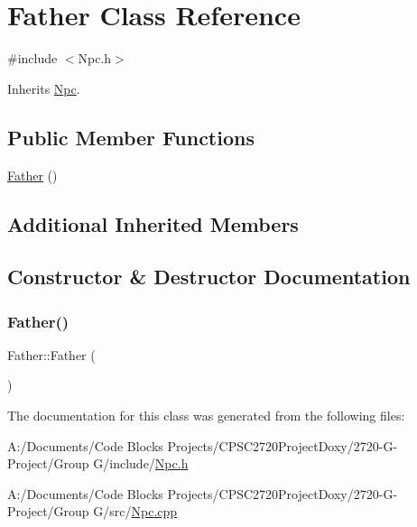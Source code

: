 \hypertarget{class_father}{}\section{Father Class Reference}
\label{class_father}


{\ttfamily \#include $<$Npc.\+h$>$}



Inherits \mbox{\hyperlink{class_npc}{Npc}}.

\subsection*{Public Member Functions}
\begin{DoxyCompactItemize}
\item 
\mbox{\hyperlink{class_father_a0b4173a7c15b5e7caaf506078d654144}{Father}} ()
\end{DoxyCompactItemize}
\subsection*{Additional Inherited Members}


\subsection{Constructor \& Destructor Documentation}
\mbox{\label{class_father_a0b4173a7c15b5e7caaf506078d654144}} 
\subsubsection{\texorpdfstring{Father()}{Father()}}
{\footnotesize\ttfamily Father\+::\+Father (\begin{DoxyParamCaption}{ }\end{DoxyParamCaption})}



The documentation for this class was generated from the following files\+:\begin{DoxyCompactItemize}
\item 
A\+:/\+Documents/\+Code Blocks Projects/\+C\+P\+S\+C2720\+Project\+Doxy/2720-\/\+G-\/\+Project/\+Group G/include/\mbox{\hyperlink{_npc_8h}{Npc.\+h}}\item 
A\+:/\+Documents/\+Code Blocks Projects/\+C\+P\+S\+C2720\+Project\+Doxy/2720-\/\+G-\/\+Project/\+Group G/src/\mbox{\hyperlink{_npc_8cpp}{Npc.\+cpp}}\end{DoxyCompactItemize}
